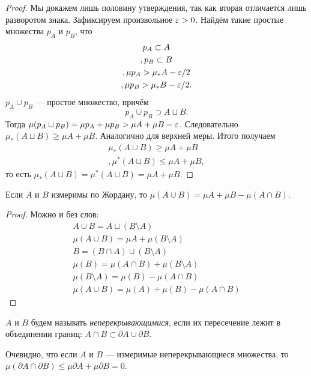 \begin{proof}
Мы докажем лишь половину утверждения, так как вторая отличается лишь разворотом знака. Зафиксируем произвольное $\varepsilon > 0$. Найдём такие простые множества $p_A$ и $p_B$, что
\begin{gather}
    p_A \subset A\\,
    p_B \subset B\\,
    \mu p_A > \mu_*A - \varepsilon/2\\,
    \mu p_B > \mu_*B - \varepsilon/2.
\end{gather}
$p_A \cup p_B$ --- простое множество, причём
$$
    p_A \cup p_B \supset A \sqcup B.
$$
Тогда $\mu(p_A \sqcup p_B) = \mu p_A + \mu p_B > \mu A + \mu B - \varepsilon$. Следовательно $\mu_*(A \sqcup B)\geqslant \mu A + \mu B$. Аналогично для верхней меры. Итого получаем
\begin{gather}
    \mu_*(A \sqcup B)\geqslant \mu A + \mu B\\,
    \mu^*(A \sqcup B)\leqslant \mu A + \mu B,
\end{gather}
то есть $\mu_*(A \sqcup B) = \mu^*(A \sqcup B) = \mu A + \mu B.$
\end{proof}
\begin{Consequence}
    Если $A$ и $B$ измеримы по Жордану, то $\mu (A \cup B) = \mu A + \mu B - \mu(A \cap B)$.
\end{Consequence}
\begin{proof}
Можно и без слов:
\begin{gather}    
    A \cup B = A \sqcup (B\setminus A)\\
    \mu (A \cup B) = \mu A + \mu(B \setminus A)\\
    B = (B \cap A) \sqcup (B \setminus A)\\
    \mu(B) = \mu(A \cap B) + \mu(B \setminus A)\\
    \mu(B \setminus A) = \mu(B) - \mu(A \cap B)\\
    \mu(A \cup B) = \mu(A) + \mu(B) - \mu(A \cap B)
\end{gather}
\end{proof}
\begin{Def}
    $A$ и $B$ будем называть \textit{неперекрывающимися}, если их пересечение лежит в объединении границ: $A\cap B \subset \partial A \cup \partial B$.
\end{Def}
Очевидно, что если $A$ и $B$ --- измеримые неперекрывающиеся множества, то $\mu(\partial A \cap \partial B) \leq \mu \partial A +\mu \partial B = 0$.
\begin{Comment}
    
\end{Comment}
